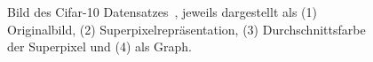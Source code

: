 \begin{figure}[t]
\centering
{}
  \caption[\gls{Cifar}-10]{Bild des \gls{Cifar}-10 Datensatzes~\cite{cifar_10}, jeweils dargestellt als (1) Originalbild, (2) Superpixelrepräsentation, (3) Durchschnittsfarbe der Superpixel und (4) als Graph.}
\label{fig:cifar_10}
\end{figure}
